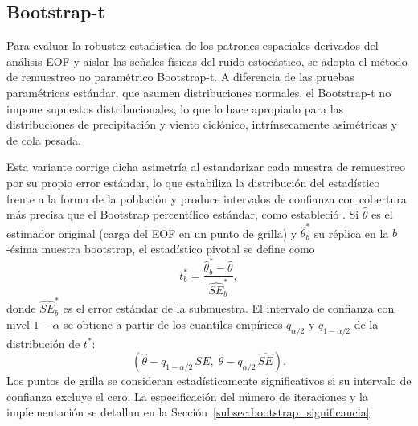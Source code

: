 \subsection{Bootstrap-t}\label{subsec:tb_bootstrap}

Para evaluar la robustez estadística de los patrones espaciales derivados del análisis EOF y aislar las señales físicas del ruido estocástico, se adopta el método de remuestreo no paramétrico Bootstrap-t.
A diferencia de las pruebas paramétricas estándar, que asumen distribuciones normales, el Bootstrap-t no impone supuestos distribucionales, lo que lo hace apropiado para las distribuciones de precipitación y viento ciclónico, intrínsecamente asimétricas y de cola pesada.

Esta variante corrige dicha asimetría al estandarizar cada muestra de remuestreo por su propio error estándar, lo que estabiliza la distribución del estadístico frente a la forma de la población y produce intervalos de confianza con cobertura más precisa que el Bootstrap percentílico estándar, como estableció \citet{hesterberg2015bootstrap}.
Si $\hat{\theta}$ es el estimador original (carga del EOF en un punto de grilla) y $\hat{\theta}^*_b$ su réplica en la $b$-ésima muestra bootstrap, el estadístico pivotal se define como
\begin{equation}\label{eq:bootstrap_t}
t^*_b = \frac{\hat{\theta}^*_b - \hat{\theta}}{\widehat{SE}^*_b},
\end{equation}
donde $\widehat{SE}^*_b$ es el error estándar de la submuestra. El intervalo de confianza con nivel $1-\alpha$ se obtiene a partir de los cuantiles empíricos $q_{\alpha/2}$ y $q_{1-\alpha/2}$ de la distribución de $t^*$:
\begin{equation}\label{eq:bootstrap_ci}
\left(\hat{\theta} - q_{1-\alpha/2}\,\widehat{SE},\; \hat{\theta} - q_{\alpha/2}\,\widehat{SE}\right).
\end{equation}
Los puntos de grilla se consideran estadísticamente significativos si su intervalo de confianza excluye el cero. La especificación del número de iteraciones y la implementación se detallan en la Sección~\ref{subsec:bootstrap_significancia}.
